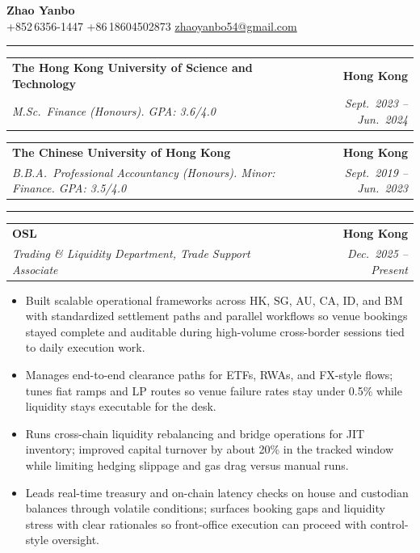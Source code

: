 \documentclass[9pt,a4paper]{extarticle}
\makeatletter
\newcommand{\ressection}[1]{%
  \vspace{0.8em}%
  \noindent{\large\scshape\bfseries #1}\par\nobreak
  \vspace{-\parskip}%
  \vspace{-\parskip}%
  \vspace{-\parskip}%
  \vspace{-\parskip}%
  \noindent\rule{\linewidth}{0.1pt}\par\nobreak
  \vspace{-\parskip}%
}
\newcommand{\resumeSubheading}[4]{%
  \vspace{0.6em}%
  \begin{tabular*}{\textwidth}{l@{\extracolsep{\fill}}r}
    \textbf{#1} & \textbf{#2} \\
    \textit{\small #3} & \textit{\small #4} \\
  \end{tabular*}\vspace{0.32em}}
\makeatother
\begin{document}
\begin{center}
  {\LARGE\bfseries Zhao Yanbo}\\[0.35em]
  \small
  +852\,6356-1447 \;\textbar\;
  +86\,18604502873 \;\textbar\;
  \href{mailto:zhaoyanbo54@gmail.com}{zhaoyanbo54@gmail.com}
\end{center}
\vspace{-0.2em}

\ressection{Education}

\resumeSubheading{The Hong Kong University of Science and Technology}{Hong Kong}{M.Sc.\ Finance (Honours). GPA: 3.6/4.0}{Sept.\ 2023 -- Jun.\ 2024}

\resumeSubheading{The Chinese University of Hong Kong}{Hong Kong}{B.B.A.\ Professional Accountancy (Honours). Minor: Finance. GPA: 3.5/4.0}{Sept.\ 2019 -- Jun.\ 2023}

\ressection{Work Experience}

\resumeSubheading{OSL}{Hong Kong}{Trading \& Liquidity Department, Trade Support Associate}{Dec.\ 2025 -- Present}
\begin{itemize}
  \item Built scalable operational frameworks across HK, SG, AU, CA, ID, and BM with standardized settlement paths and parallel workflows so venue bookings stayed complete and auditable during high-volume cross-border sessions tied to daily execution work.
  \item Manages end-to-end clearance paths for ETFs, RWAs, and FX-style flows; tunes fiat ramps and LP routes so venue failure rates stay under 0.5\% while liquidity stays executable for the desk.
  \item Runs cross-chain liquidity rebalancing and bridge operations for JIT inventory; improved capital turnover by about 20\% in the tracked window while limiting hedging slippage and gas drag versus manual runs.
  \item Leads real-time treasury and on-chain latency checks on house and custodian balances through volatile conditions; surfaces booking gaps and liquidity stress with clear rationales so front-office execution can proceed with control-style oversight.
\end{itemize}
\end{document}
